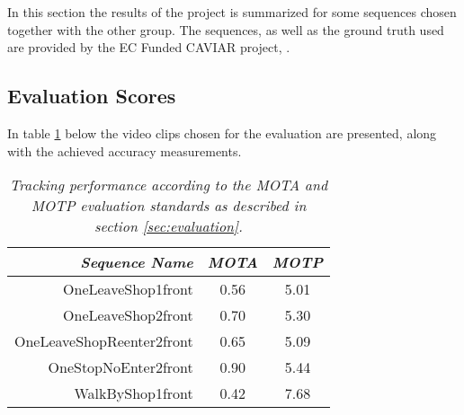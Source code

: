In this section the results of the project is summarized for some sequences chosen together with the other group. The sequences, as well as the ground truth used are provided by the EC Funded CAVIAR project, \cite{CAVIAR}.

\subsection{Evaluation Scores}
In table \ref{tab:evaluation_performance} below the video clips chosen for the evaluation are presented, along with the achieved accuracy measurements.

\begin{table}[h]
\centering
	\begin{tabular}{r | c | c }
		\emph{Sequence Name}		& \emph{MOTA} & \emph{MOTP} \\
		\hline \hline
		OneLeaveShop1front			& 0.56 & 5.01 \\
		OneLeaveShop2front			& 0.70 & 5.30 \\
		OneLeaveShopReenter2front	& 0.65 & 5.09 \\
		OneStopNoEnter2front 		& 0.90 & 5.44 \\
		WalkByShop1front 			& 0.42 & 7.68 \\
	\end{tabular}
	\caption{\textit{Tracking performance according to the MOTA and MOTP evaluation standards as described in section \ref{sec:evaluation}.}}
	\label{tab:evaluation_performance}
\end{table}

